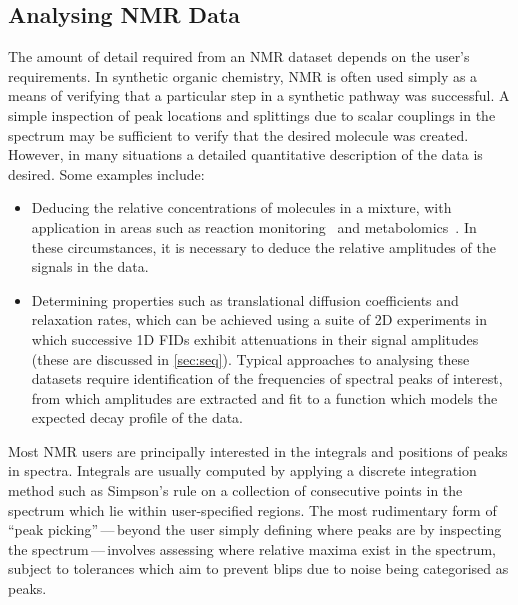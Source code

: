 \subsection{Analysing NMR Data}
\label{subsec:estimation-techniques}
The amount of detail required from an \ac{NMR} dataset depends on
the user's requirements. In synthetic organic chemistry, \ac{NMR} is often used
simply as a means of verifying that a particular step in a synthetic pathway
was successful. A simple inspection of peak locations and splittings due to
scalar couplings in the spectrum may be sufficient to verify that the desired
molecule was created. However, in many situations a detailed quantitative
description of the data is desired. Some examples include:
\begin{itemize}
    \item Deducing the relative concentrations of molecules in a mixture,
        with application in areas such as reaction
        monitoring~\cite{Bernstein2016} and metabolomics~\cite{Emwas2019}.
        In these circumstances, it is necessary to deduce the relative
        amplitudes of the signals in the data.
    \item Determining properties such as translational diffusion coefficients
        and relaxation rates, which can be achieved using a suite of \ac{2D}
        experiments in which successive \ac{1D} \acp{FID} exhibit
        attenuations in their signal amplitudes (these are discussed in
        \cref{sec:seq}).  Typical approaches to analysing these datasets
        require identification of the frequencies of spectral peaks of
        interest, from which amplitudes are extracted and fit to a
        function which models the expected decay profile of the data.
\end{itemize}

Most \ac{NMR} users are principally interested in the integrals and positions
of peaks in spectra.\label{corr:delete-T2}
Integrals are usually computed by applying a discrete integration method such
as Simpson's rule on a collection of consecutive points in the spectrum which
lie within user-specified regions.
The most rudimentary form of ``peak picking''\,---\,beyond the user
simply defining where peaks are by inspecting the spectrum\,---\,involves
assessing where relative maxima exist in the spectrum, subject to
tolerances which aim to prevent blips due to noise being categorised as
peaks.

